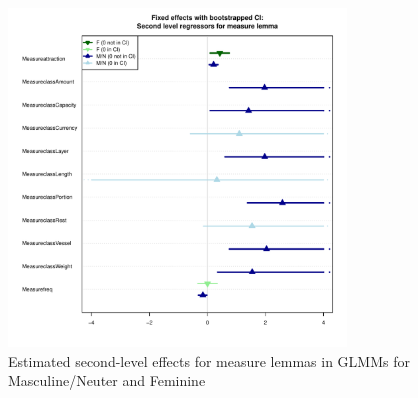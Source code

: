 \documentclass[USenglish]{article}
\begin{document}
\begin{figure}[h]
\centering
\includegraphics[width=0.8\textwidth]{figures/corpus/04_glmm_fixef_secondlevel_measure}
\caption{Estimated second-level effects for measure lemmas in GLMMs for Masculine\slash Neuter and Feminine}
\label{fig:glmmfixef}
\end{figure}
\end{document}
